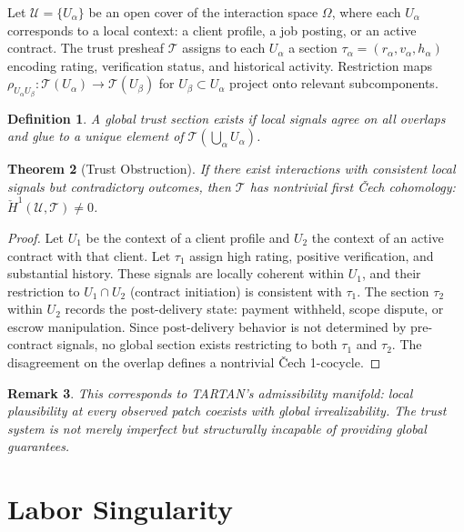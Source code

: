 \documentclass[11pt]{article}
\newtheorem{theorem}{Theorem}
\newtheorem{definition}[theorem]{Definition}
\newtheorem{remark}[theorem]{Remark}
\begin{document}
Let $\mathcal{U} = \{U_\alpha\}$ be an open cover of the interaction space
$\Omega$, where each $U_\alpha$ corresponds to a local context: a client
profile, a job posting, or an active contract. The trust presheaf
$\mathscr{T}$ assigns to each $U_\alpha$ a section $\tau_\alpha =
(r_\alpha, v_\alpha, h_\alpha)$ encoding rating, verification status, and
historical activity. Restriction maps $\rho_{U_\alpha U_\beta} :
\mathscr{T}(U_\alpha) \to \mathscr{T}(U_\beta)$ for $U_\beta \subset
U_\alpha$ project onto relevant subcomponents.

\begin{definition}
A global trust section exists if local signals agree on all overlaps and
glue to a unique element of $\mathscr{T}(\bigcup_\alpha U_\alpha)$.
\end{definition}

\begin{theorem}[Trust Obstruction]
\label{thm:obstruction}
If there exist interactions with consistent local signals but contradictory
outcomes, then $\mathscr{T}$ has nontrivial first \v{C}ech cohomology:
$\check{H}^1(\mathcal{U}, \mathscr{T}) \neq 0$.
\end{theorem}

\begin{proof}
Let $U_1$ be the context of a client profile and $U_2$ the context of an
active contract with that client. Let $\tau_1$ assign high rating, positive
verification, and substantial history. These signals are locally coherent
within $U_1$, and their restriction to $U_1 \cap U_2$ (contract initiation)
is consistent with $\tau_1$. The section $\tau_2$ within $U_2$ records the
post-delivery state: payment withheld, scope dispute, or escrow manipulation.
Since post-delivery behavior is not determined by pre-contract signals, no
global section exists restricting to both $\tau_1$ and $\tau_2$. The
disagreement on the overlap defines a nontrivial \v{C}ech 1-cocycle.
\end{proof}

\begin{remark}
This corresponds to TARTAN's admissibility manifold: local plausibility at
every observed patch coexists with global irrealizability. The trust system
is not merely imperfect but structurally incapable of providing global
guarantees.
\end{remark}

\section{Labor Singularity}
\label{sec:singularity}
\end{document}
